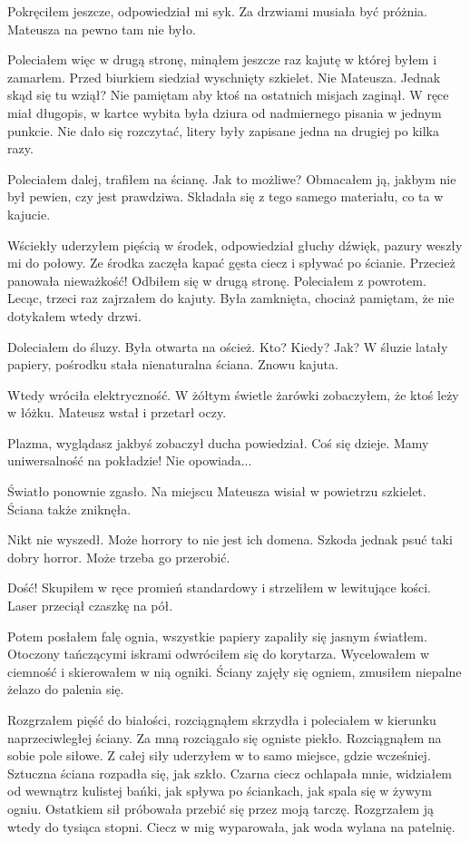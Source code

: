 Pokręciłem jeszcze, odpowiedział mi syk. 
Za drzwiami musiała być próżnia.
Mateusza na pewno tam nie było.

Poleciałem więc w drugą stronę, minąłem jeszcze raz kajutę w której byłem i zamarłem.
Przed biurkiem siedział wyschnięty szkielet. Nie Mateusza.
Jednak skąd się tu wziął? Nie pamiętam aby ktoś na ostatnich misjach zaginął. 
W ręce miał długopis, w kartce wybita była dziura od nadmiernego pisania w jednym punkcie. 
Nie dało się rozczytać, litery były zapisane jedna na drugiej po kilka razy.

Poleciałem dalej, trafiłem na ścianę. Jak to możliwe?
Obmacałem ją, jakbym nie był pewien, czy jest prawdziwa.
Składała się z tego samego materiału, co ta w kajucie.

Wściekły uderzyłem pięścią w środek, odpowiedział głuchy dźwięk, pazury weszły mi do połowy.
Ze środka zaczęła kapać gęsta ciecz i spływać po ścianie.
Przecież panowała nieważkość!
Odbiłem się w drugą stronę. Poleciałem z powrotem.
Lecąc, trzeci raz zajrzałem do kajuty.
Była zamknięta, chociaż pamiętam, że nie dotykałem wtedy drzwi.

Doleciałem do śluzy. Była otwarta na oścież.
Kto? Kiedy? Jak?
W śluzie latały papiery, pośrodku stała nienaturalna ściana. Znowu kajuta.

Wtedy wróciła elektryczność.
W żółtym świetle żarówki zobaczyłem, że ktoś leży w łóżku.
Mateusz wstał i przetarł oczy.
\begin{dialogue}
\ds{} Plazma, wyglądasz jakbyś zobaczył ducha \dm{} powiedział.
\ds{} Coś się dzieje. Mamy uniwersalność na pokładzie!
\ds{} Nie opowiada...
\end{dialogue}

Światło ponownie zgasło.
Na miejscu Mateusza wisiał w powietrzu szkielet.
Ściana także zniknęła.

\divider{} 

Nikt nie wyszedł. Może horrory to nie jest ich domena. 
Szkoda jednak psuć taki dobry horror. 
Może trzeba go przerobić.

\divider{}

Dość!
Skupiłem w ręce promień standardowy i strzeliłem w lewitujące kości.
Laser przeciął czaszkę na pół.

Potem posłałem falę ognia, wszystkie papiery zapaliły się jasnym światłem.
Otoczony tańczącymi iskrami odwróciłem się do korytarza.
Wycelowałem w ciemność i skierowałem w nią ogniki.
Ściany zajęły się ogniem, zmusiłem niepalne żelazo do palenia się.

Rozgrzałem pięść do białości, rozciągnąłem skrzydła i poleciałem w kierunku naprzeciwległej ściany.
Za mną rozciągało się ogniste piekło.
Rozciągnąłem na sobie pole siłowe.
Z całej siły uderzyłem w to samo miejsce, gdzie wcześniej.
Sztuczna ściana rozpadła się, jak szkło. Czarna ciecz ochlapała mnie, widziałem od wewnątrz kulistej bańki, jak spływa po ściankach, jak spala się w żywym ogniu.
Ostatkiem sił próbowała przebić się przez moją tarczę. Rozgrzałem ją wtedy do tysiąca stopni. Ciecz w mig wyparowała, jak woda wylana na patelnię.


